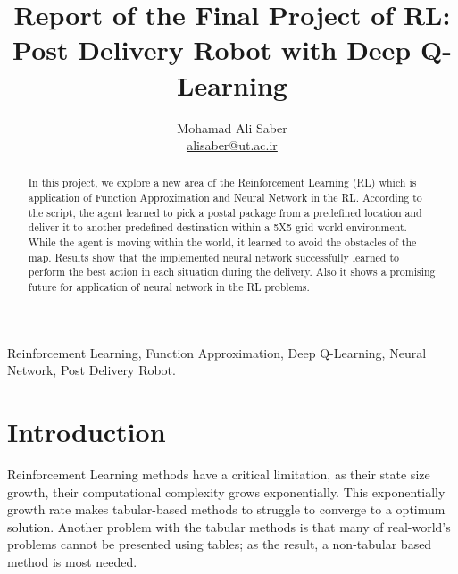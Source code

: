 \documentclass[lettersize,journal]{IEEEtran}
\begin{document}
\title{Report of the Final Project of RL:\\Post Delivery Robot with Deep Q-Learning}

\author{Mohamad Ali Saber\\ \href{mailto:alisaber@ut.ac.ir}{alisaber@ut.ac.ir}}




\maketitle






\begin{abstract}
In this project, we explore a new area of the Reinforcement Learning (RL) which is application of Function Approximation and Neural Network in the RL. According to the script, the agent learned to pick a postal package from a predefined location and deliver it to another predefined destination within a 5X5 grid-world environment. While the agent is moving within the world, it learned to avoid the obstacles of the map.
Results show that the implemented neural network successfully learned to perform the best action in each situation during the delivery. Also it shows a promising future for application of neural network in the RL problems.
\end{abstract}

\begin{IEEEkeywords}
Reinforcement Learning, Function Approximation, Deep Q-Learning, Neural Network, Post Delivery Robot.
\end{IEEEkeywords}




\section{Introduction}
 Reinforcement Learning methods have a critical limitation, as their state size growth, their computational complexity grows exponentially. This exponentially growth rate makes tabular-based methods to struggle to converge to a optimum solution. Another problem with the tabular methods is that many of real-world's problems cannot be presented using tables; as the result, a non-tabular based method is most needed.\par
\end{document}

